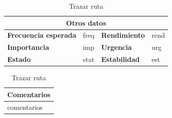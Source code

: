 \documentclass[12pt,spanish]{article}
\begin{document}
\begin{table}[H]
\vspace{1cm}

\begin{tabular}{|m{3.72cm}|m{3.72cm}|m{3.72cm}|m{3.72cm}|}
\hline
\multicolumn{4}{|c|}{\textbf{Otros datos}} \\
\hline
\textbf{Frecuencia esperada} & freq & \textbf{Rendimiento} & rend \\
\hline
\textbf{Importancia} & imp & \textbf{Urgencia} & urg \\
\hline
\textbf{Estado} & stat & \textbf{Estabilidad} & est \\
\hline
\end{tabular}

\vspace{1cm}

\begin{tabular}{|m{16.2cm}|}
\hline
\textbf{Comentarios} \\
\hline
comentarios \\
\hline
\end{tabular}

\caption{Trazar ruta}

\end{table}


\end{document}
